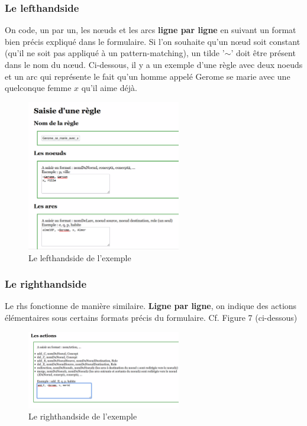 \documentclass[11pt,a4paper]{article}
\begin{document}
\subsubsection{Le lefthandside}
On code, un par un, les nœuds et les arcs \textbf{ligne par ligne} en suivant un format bien précis expliqué dans le formulaire. Si l'on souhaite qu'un nœud soit constant (qu'il ne soit pas appliqué à un pattern-matching), un tilde '$\sim$' doit être présent dans le nom du nœud. Ci-dessous, il y a un exemple d'une règle avec deux noeuds et un arc qui représente le fait qu'un homme appelé Gerome se marie avec une quelconque femme $x$ qu'il aime déjà. 
\begin{figure}[htbp]
  \centering
  \includegraphics[width=0.6\textwidth]{screen8.png}
  \caption{Le lefthandside de l'exemple}
  \label{fig:mon_image}
\end{figure}
\subsubsection{Le righthandside}
Le rhs fonctionne de manière similaire. \textbf{Ligne par ligne}, on indique des actions élémentaires sous certains formats précis du formulaire. Cf. Figure 7 (ci-dessous)
\begin{figure}[htbp]
  \centering
  \includegraphics[width=0.6\textwidth]{screen9.png}
  \caption{Le righthandside de l'exemple}
  \label{fig:mon_image}
\end{figure}
\end{document}
